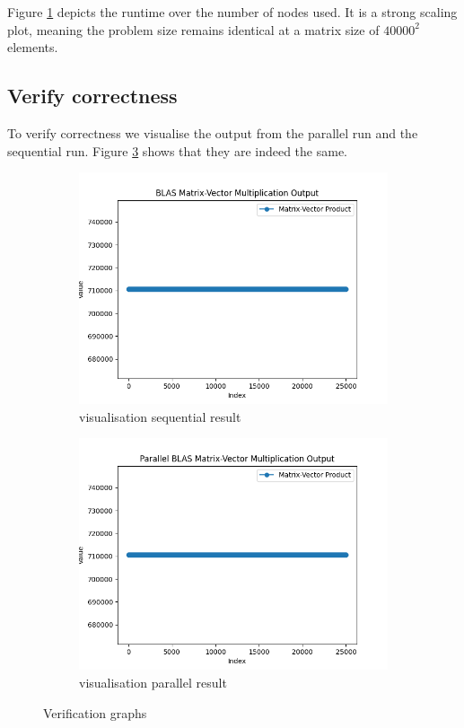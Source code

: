 \documentclass[a4paper,10pt]{article}
\begin{document}
Figure \ref{fig:ex4_strong_scaling} depicts the runtime over the number of nodes used.
It is a strong scaling plot, meaning the problem size remains identical at a matrix size of $40000^2$ elements.

\subsection{Verify correctness}
To verify correctness we visualise the output from the parallel run and the sequential run.
Figure \ref{fig:verification_graphs_ex4} shows that they are indeed the same.

\begin{figure}
     \centering
     \begin{subfigure}[b]{0.45\textwidth}
         \centering
         \includegraphics[width=\textwidth]{img/ex4_sequential}
         \caption{visualisation sequential result}
         \label{fig:ex4_strong_scaling}
     \end{subfigure}
     \hfill
     \begin{subfigure}[b]{0.45\textwidth}
         \centering
         \includegraphics[width=\textwidth]{img/ex4_parallel}
         \caption{visualisation parallel result}
         \label{fig:ex4_parallel}
     \end{subfigure}
     \caption{Verification graphs}
     \label{fig:verification_graphs_ex4}
\end{figure}
\end{document}

